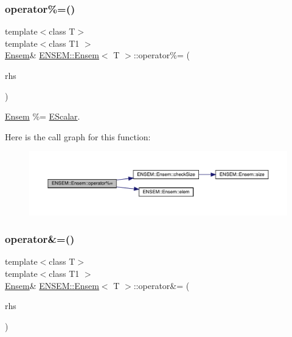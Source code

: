 \subsubsection{\texorpdfstring{operator\%=()}{operator\%=()}\hspace{0.1cm}{\footnotesize\ttfamily [2/2]}}
{\footnotesize\ttfamily template$<$class T$>$ \\
template$<$class T1 $>$ \\
\mbox{\hyperlink{classENSEM_1_1Ensem}{Ensem}}\& \mbox{\hyperlink{classENSEM_1_1Ensem}{E\+N\+S\+E\+M\+::\+Ensem}}$<$ T $>$\+::operator\%= (\begin{DoxyParamCaption}\item[{const \mbox{\hyperlink{classENSEM_1_1EScalar}{E\+Scalar}}$<$ T1 $>$ \&}]{rhs }\end{DoxyParamCaption})\hspace{0.3cm}{\ttfamily [inline]}}



\mbox{\hyperlink{classENSEM_1_1Ensem}{Ensem}} \%= \mbox{\hyperlink{classENSEM_1_1EScalar}{E\+Scalar}}. 

Here is the call graph for this function\+:
\nopagebreak
\begin{figure}[H]
\begin{center}
\leavevmode
\includegraphics[width=350pt]{d7/d3e/classENSEM_1_1Ensem_a8f910ad50fa1625b535bd2456aa7ad64_cgraph}
\end{center}
\end{figure}
\mbox{\label{classENSEM_1_1Ensem_ab5e9900522968210e53ec66b09a402fe}} 
\subsubsection{\texorpdfstring{operator\&=()}{operator\&=()}\hspace{0.1cm}{\footnotesize\ttfamily [1/2]}}
{\footnotesize\ttfamily template$<$class T$>$ \\
template$<$class T1 $>$ \\
\mbox{\hyperlink{classENSEM_1_1Ensem}{Ensem}}\& \mbox{\hyperlink{classENSEM_1_1Ensem}{E\+N\+S\+E\+M\+::\+Ensem}}$<$ T $>$\+::operator\&= (\begin{DoxyParamCaption}\item[{const \mbox{\hyperlink{classENSEM_1_1EScalar}{E\+Scalar}}$<$ T1 $>$ \&}]{rhs }\end{DoxyParamCaption})\hspace{0.3cm}{\ttfamily [inline]}}



